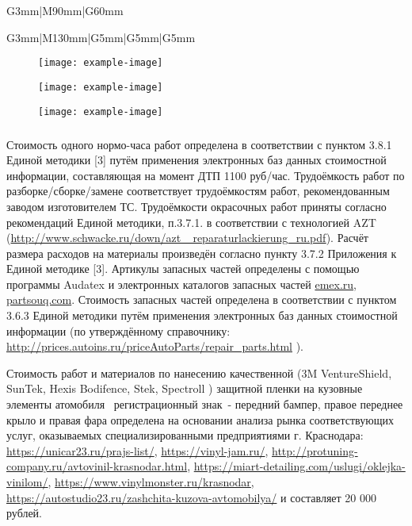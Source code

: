 \begin{longtable}{G{3mm}|M{90mm}|G{60mm}}
\begin{longtable}{G{3mm}|M{130mm}|G{5mm}|G{5mm}|G{5mm}}
		
		\begin{figure}[H]
			\centering
			\texttt{[image: example-image]}
		\end{figure}
		
		\begin{figure}[H]
			\centering
			\texttt{[image: example-image]}
		\end{figure}
		\begin{figure}[H]
			\centering
			\texttt{[image: example-image]}
		\end{figure}
		\medskip
		\renewcommand\baselinestretch{1.2}\small\normalsize
		
		
		\subparagraph{}Стоимость одного нормо-часа работ определена в соответствии с пунктом 3.8.1 Единой методики [3] путём применения электронных баз данных стоимостной информации, составляющая на момент ДТП 1100 руб/час.
		Трудоёмкость работ по разборке/сборке/замене  соответствует трудоёмкостям работ, рекомендованным заводом изготовителем ТС. Трудоёмкости окрасочных работ приняты согласно рекомендаций Единой методики, п.3.7.1. в соответствии с технологией  AZT (\url{http://www.schwacke.ru/down/azt _reparaturlackierung_ru.pdf}). Расчёт размера расходов на материалы произведён  согласно пункту 3.7.2 Приложения к Единой методике [3]. Артикулы запасных частей определены с помощью программы Audatex и электронных  каталогов запасных частей \url{emex.ru}, \url{partsouq.com}.
		Стоимость запасных частей определена в соответствии с пунктом 3.6.3 Единой методики путём применения электронных баз данных стоимостной информации (по утверждённому справочнику: \url{http://prices.autoins.ru/priceAutoParts/repair_parts.html} ).
		
		Стоимость работ и материалов по нанесению качественной (3M VentureShield, SunTek, Hexis Bodifence, Stek, Spectroll ) защитной пленки на кузовные элементы атомобиля   \, регистрационный знак \,- передний бампер,  правое переднее крыло и правая фара определена на основании анализа рынка соответствующих услуг, оказываемых специализированными предприятиями г. Краснодара: \url{https://unicar23.ru/prajs-list/},
		\url{https://vinyl-jam.ru/}, \url{http://protuning-company.ru/avtovinil-krasnodar.html}, \url{https://miart-detailing.com/uslugi/oklejka-vinilom/}, \url{https://www.vinylmonster.ru/krasnodar}, \url{https://autostudio23.ru/zashchita-kuzova-avtomobilya/}
		и составляет 20 000 рублей.
		

\end{longtable}
\end{longtable}
